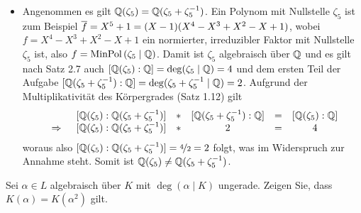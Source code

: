 \begin{exercisePage}
\begin{itemize}[leftmargin=*]
        \item Angenommen es gilt $\mathbb{Q}(\zeta_5) = \mathbb{Q}(\zeta_5 + \zeta_5^{-1})$. Ein Polynom mit Nullstelle $\zeta_5$ ist zum Beispiel $\overline{f} = X^5 + 1 = (X - 1)(X^4 - X^3 + X^2 - X + 1)$, wobei $f = X^4 - X^3 + X^2 - X + 1$ ein normierter, irreduzibler Faktor mit Nullstelle $\zeta_5$ ist, also $f = \operatorname{MinPol}\left( \zeta_5 \mathrel{|} \mathbb{Q}\right)$. Damit ist $\zeta_5$ algebraisch über $\mathbb{Q}$ und es gilt nach Satz 2.7 auch $[\mathbb{Q}(\zeta_5) : \mathbb{Q}] = \deg(\zeta_5 \mid \mathbb{Q}) = 4$ und dem ersten Teil der Aufgabe $[\mathbb{Q}(\zeta_5 + \zeta_5^{-1}) : \mathbb{Q}] = \deg( \zeta_5 + \zeta_5^{-1} \mid \mathbb{Q}) = 2$. Aufgrund der Multiplikativität des Körpergrades (Satz 1.12) gilt
        \begin{equation*}
            \begin{array}{rccccc}
            & [\Q(\zeta_5) : \Q(\zeta_5 + \zeta_5^{-1})] & * & [\Q(\zeta_5 + \zeta_5^{-1}) : \Q] & = & [ \Q( \zeta_5 ) : \Q ] \\%
            \follows & \lbrack \Q ( \zeta_5 ) : \Q ( \zeta_5 + \zeta_5^{-1} ) \rbrack & * & 2 & = & 4 \\
            \end{array}
        \end{equation*}
        woraus also $[\Q(\zeta_5) : \Q(\zeta_5 + \zeta_5^{-1})] = \lfrac{4}{2} = 2$ folgt, was im Widerspruch zur Annahme steht. Somit ist $\mathbb{Q}(\zeta_5) \neq \mathbb{Q}(\zeta_5 + \zeta_5^{-1})$.       
    \end{itemize}

    
    \begin{homework}
        Sei $\alpha \in L$ algebraisch über $K$ mit $\deg( \alpha \mid K)$ ungerade. Zeigen Sie, dass $K(\alpha) = K(\alpha^2)$ gilt.
    \end{homework}


\end{exercisePage}
